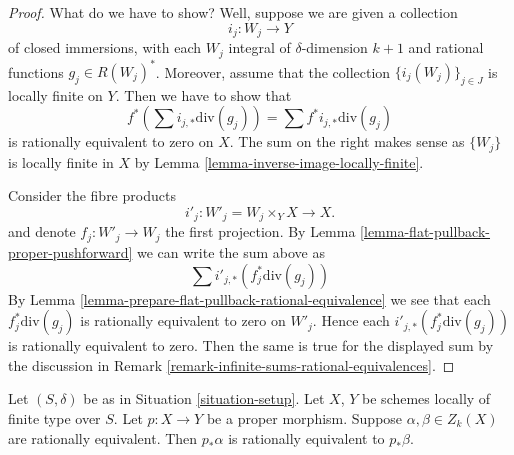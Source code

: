 \begin{proof}
What do we have to show? Well, suppose we are given a collection
$$
i_j : W_j \longrightarrow Y
$$
of closed immersions, with each $W_j$ integral of $\delta$-dimension $k + 1$
and rational functions $g_j \in R(W_j)^*$. Moreover, assume that
the collection $\{i_j(W_j)\}_{j \in J}$ is locally finite on $Y$.
Then we have to show that
$$
f^*(\sum i_{j, *}\text{div}(g_j)) = \sum f^*i_{j, *}\text{div}(g_j)
$$
is rationally equivalent to zero on $X$. The sum on the right
makes sense as $\{W_j\}$ is locally finite in $X$ by
Lemma \ref{lemma-inverse-image-locally-finite}.

\medskip\noindent
Consider the fibre products
$$
i'_j : W'_j = W_j \times_Y X \longrightarrow X.
$$
and denote $f_j : W'_j \to W_j$ the first projection.
By Lemma \ref{lemma-flat-pullback-proper-pushforward}
we can write the sum above as
$$
\sum i'_{j, *}(f_j^*\text{div}(g_j))
$$
By Lemma \ref{lemma-prepare-flat-pullback-rational-equivalence}
we see that each $f_j^*\text{div}(g_j)$ is rationally equivalent
to zero on $W'_j$. Hence each $i'_{j, *}(f_j^*\text{div}(g_j))$
is rationally equivalent to zero. Then the same is true for
the displayed sum by the discussion in
Remark \ref{remark-infinite-sums-rational-equivalences}.
\end{proof}

\begin{lemma}
\label{lemma-proper-pushforward-rational-equivalence}
Let $(S, \delta)$ be as in Situation \ref{situation-setup}.
Let $X$, $Y$ be schemes locally of finite type over $S$.
Let $p : X \to Y$ be a proper morphism.
Suppose $\alpha, \beta \in Z_k(X)$ are rationally equivalent.
Then $p_*\alpha$ is rationally equivalent to $p_*\beta$.
\end{lemma}


